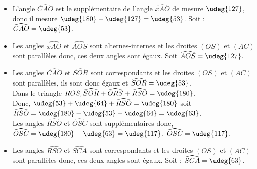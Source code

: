 \begin{colonne*exercice}
\begin{corrige}
   \begin{itemize}
      \item L'angle $\widehat{CAO}$ est le supplémentaire de l'angle $\widehat{xAO}$ de mesure $\udeg{127}$, donc il mesure $\udeg{180}-\udeg{127} =\udeg{53}$. Soit : {\blue $\widehat{CAO} =\udeg{53}$}.
      \item Les angles $\widehat{xAO}$ et $\widehat{AOS}$ sont alternes-internes et les droites $(OS)$ et $(AC)$ sont parallèles donc, ces deux angles sont égaux. Soit {\blue $\widehat{AOS} =\udeg{127}$}.
      \item Les angles $\widehat{CAO}$ et $\widehat{SOR}$ sont correspondants et les droites $(OS)$ et $(AC)$ sont parallèles, ils sont donc égaux et $\widehat{SOR} =\udeg{53}$. \\
         Dans le triangle $ROS, \widehat{SOR}+\widehat{ORS}+\widehat{RSO} =\udeg{180}$. \\ 
         Donc, $\udeg{53}+\udeg{64}+\widehat{RSO} =\udeg{180}$ soit $\widehat{RSO} =\udeg{180}-\udeg{53}-\udeg{64} =\udeg{63}$. \\
          Les angles $\widehat{RSO}$ et $\widehat{OSC}$ sont supplémentaires donc, $\widehat{OSC} =\udeg{180}-\udeg{63} =\udeg{117}$. {\blue $\widehat{OSC} =\udeg{117}$}.
      \item Les angles $\widehat{RSO}$ et $\widehat{SCA}$ sont correspondants et les droites $(OS)$ et $(AC)$ sont parallèles donc, ces deux angles sont égaux. Soit : {\blue $\widehat{SCA} =\udeg{63}$}.
   \end{itemize}
\end{corrige}



\end{colonne*exercice}
